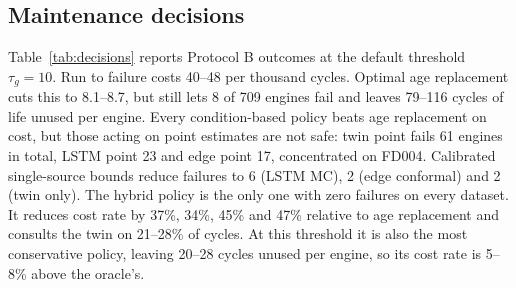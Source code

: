 \documentclass[preprint,12pt,authoryear]{elsarticle}
\begin{document}
\subsection{Maintenance decisions}
Table~\ref{tab:decisions} reports Protocol B outcomes at the default threshold $\tau_g = 10$. Run to failure costs 40--48 per thousand cycles. Optimal age replacement cuts this to 8.1--8.7, but still lets 8 of 709 engines fail and leaves 79--116 cycles of life unused per engine. Every condition-based policy beats age replacement on cost, but those acting on point estimates are not safe: twin point fails 61 engines in total, LSTM point 23 and edge point 17, concentrated on FD004. Calibrated single-source bounds reduce failures to 6 (LSTM MC), 2 (edge conformal) and 2 (twin only). The hybrid policy is the only one with zero failures on every dataset. It reduces cost rate by 37\%, 34\%, 45\% and 47\% relative to age replacement and consults the twin on 21--28\% of cycles. At this threshold it is also the most conservative policy, leaving 20--28 cycles unused per engine, so its cost rate is 5--8\% above the oracle's.
\end{document}
